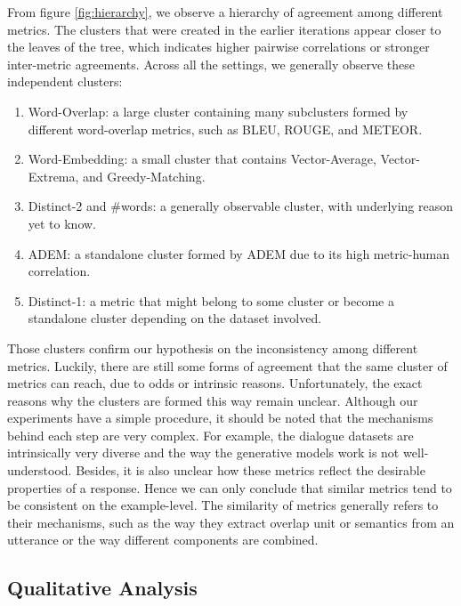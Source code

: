 \documentclass[runningheads]{llncs}
\begin{document}
    From figure \ref{fig:hierarchy}, we observe a hierarchy of agreement among different metrics. The clusters that were created in the earlier iterations appear closer to the leaves of the tree, which indicates higher pairwise correlations or stronger inter-metric agreements. Across all the settings, we generally observe these independent clusters:
    \begin{enumerate}
        \item Word-Overlap: a large cluster containing many subclusters formed by different word-overlap metrics, such as BLEU, ROUGE, and METEOR.
        \item Word-Embedding: a small cluster that contains Vector-Average, Vector-Extrema, and Greedy-Matching.
        \item Distinct-2 and \#words: a generally observable cluster, with underlying reason yet to know.
        \item ADEM: a standalone cluster formed by ADEM due to its high metric-human correlation.
        \item Distinct-1: a metric that might belong to some cluster or become a standalone cluster depending on the dataset involved.
    \end{enumerate}
    

    Those clusters confirm our hypothesis on the inconsistency among different metrics. Luckily, there are still some forms of agreement that the same cluster of metrics can reach, due to odds or intrinsic reasons. Unfortunately, the exact reasons why the clusters are formed this way remain unclear. Although our experiments have a simple procedure, it should be noted that the mechanisms behind each step are very complex. For example, the dialogue datasets are intrinsically very diverse and the way the generative models work is not well-understood. Besides, it is also unclear how these metrics reflect the desirable properties of a response. Hence we can only conclude that similar metrics tend to be consistent on the example-level. The similarity of metrics generally refers to their mechanisms, such as the way they extract overlap unit or semantics from an utterance or the way different components are combined.

    \begin{table}
        
    \end{table}

    \subsection{Qualitative Analysis}
\end{document}
